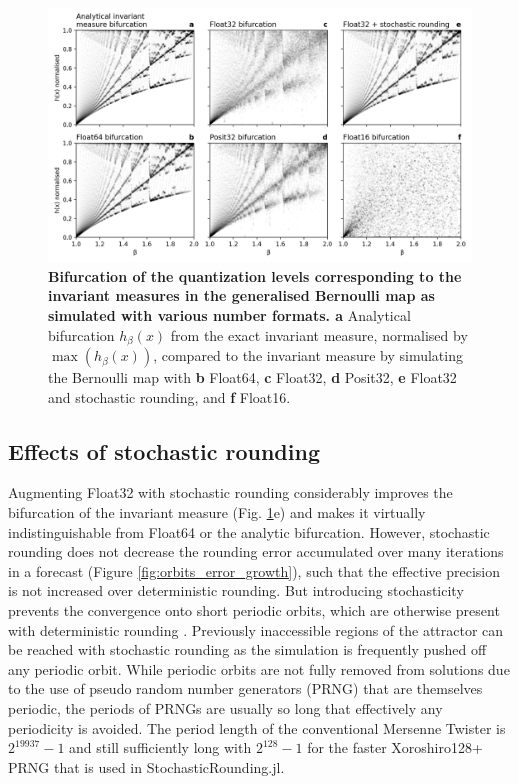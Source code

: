 \begin{figure}[tbhp]
	\includegraphics[width=1\textwidth]{Figures/orbits/bifurcation.png}
	\caption{\textbf{Bifurcation of the quantization levels corresponding to the invariant measures in
	the generalised Bernoulli map as simulated with various number formats. a}
	Analytical bifurcation $h_\beta(x)$ from the exact invariant measure, normalised by $\max(h_\beta(x))$,
	compared to the invariant measure by simulating the Bernoulli map with \textbf{b} Float64, \textbf{c} Float32,
	\textbf{d} Posit32, \textbf{e} Float32 and stochastic rounding, and \textbf{f} Float16.}
	\label{fig:orbits_bifurcation}
\end{figure}

\subsection{Effects of stochastic rounding}
\label{sec:orbits_stochastic_rounding}

Augmenting Float32 with stochastic rounding considerably improves the bifurcation of the invariant measure (Fig. \ref{fig:orbits_bifurcation}e)
and makes it virtually indistinguishable from Float64 or the analytic bifurcation. However, stochastic rounding does not decrease the rounding
error accumulated over many iterations in a forecast (Figure \ref{fig:orbits_error_growth}), such that the effective precision is not increased
over deterministic rounding. But introducing stochasticity prevents the convergence onto short periodic orbits, which are otherwise present
with deterministic rounding \citep{Boghosian2019}. Previously inaccessible regions of the attractor can be reached with stochastic rounding
as the simulation is frequently pushed off any periodic orbit. While periodic orbits are not fully removed from solutions due to the use of
pseudo random number generators (PRNG) that are themselves periodic, the periods of PRNGs are usually so long that effectively any
periodicity is avoided. The period length of the conventional Mersenne Twister \citep{Matsumoto1998} is $2^{19937}-1$ and still sufficiently
long with $2^{128} - 1$ for the faster Xoroshiro128+ \citep{Blackman2019} PRNG that is used in StochasticRounding.jl.

